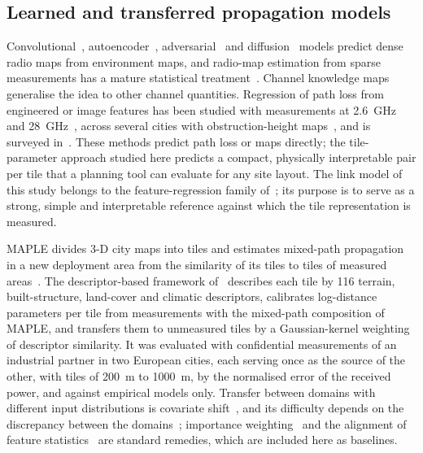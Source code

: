 \subsection{Learned and transferred propagation models}
Convolutional~\cite{levie2021radiounet}, autoencoder~\cite{teganya2022},
adversarial~\cite{zhang2023rmegan} and diffusion~\cite{wang2025radiodiff}
models predict dense radio maps from environment maps, and radio-map
estimation from sparse measurements has a mature statistical
treatment~\cite{romero2022}. Channel knowledge maps~\cite{zeng2021ckm}
generalise the idea to other channel quantities. Regression of path loss
from engineered or image features has been studied with measurements at
\SI{2.6}{\giga\hertz}~\cite{thrane2020} and
\SI{28}{\giga\hertz}~\cite{gupta2022}, across several cities with
obstruction-height maps~\cite{dempsey2025}, and is surveyed
in~\cite{seretis2022}. These methods predict path loss or maps directly; the
tile-parameter approach studied here predicts a compact, physically
interpretable pair per tile that a planning tool can evaluate for any site
layout. The link model of this study belongs to the feature-regression
family of~\cite{thrane2020,dempsey2025}; its purpose is to serve as a
strong, simple and interpretable reference against which the tile
representation is measured.

MAPLE divides 3-D city maps into tiles and estimates mixed-path propagation
in a new deployment area from the similarity of its tiles to tiles of
measured areas~\cite{ozyurt2020maple}. The descriptor-based framework
of~\cite{ozyurt2026} describes each tile by 116 terrain, built-structure,
land-cover and climatic descriptors, calibrates log-distance parameters per
tile from measurements with the mixed-path composition of MAPLE, and
transfers them to unmeasured tiles by a Gaussian-kernel weighting of
descriptor similarity. It was evaluated with confidential measurements of an
industrial partner in two European cities, each serving once as the source
of the other, with tiles of \SI{200}{\metre} to \SI{1000}{\metre}, by the
normalised error of the received power, and against empirical models only.
Transfer between domains with different input distributions is covariate
shift~\cite{shimodaira2000}, and its difficulty depends on the discrepancy
between the domains~\cite{bendavid2010}; importance
weighting~\cite{shimodaira2000} and the alignment of feature
statistics~\cite{sun2016coral} are standard remedies, which are included
here as baselines.

